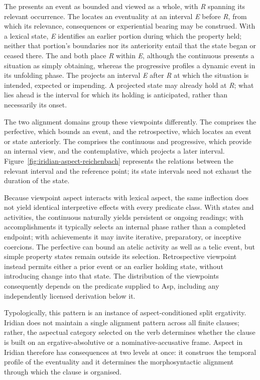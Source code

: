 The  presents an event as bounded and viewed as a whole,
with \textit{R} spanning its relevant occurrence. The 
locates an eventuality at an interval \textit{E} before \textit{R}, from which
its relevance, consequences or experiential bearing may be construed. With
a lexical state, \textit{E} identifies an earlier portion during which the
property held; neither that portion's boundaries nor its anteriority entail
that the state began or ceased there. The  and
 both place \textit{R} within \textit{E}, although the
continuous presents a situation as simply obtaining, whereas the progressive
profiles a dynamic event in its unfolding phase. The 
projects an interval \textit{E} after \textit{R} at which the situation is
intended, expected or impending. A projected state may already hold at
\textit{R}; what lies ahead is the interval for which its holding is
anticipated, rather than necessarily its onset.

The two alignment domains group these viewpoints differently. The
 comprises the perfective, which bounds an event,
and the retrospective, which locates an event or state anteriorly. The
 comprises the continuous and progressive,
which provide an internal view, and the contemplative, which projects a
later interval. Figure~\ref{fig:iridian-aspect-reichenbach} represents the
relations between the relevant interval and the reference point; its state
intervals need not exhaust the duration of the state.

Because viewpoint aspect interacts with lexical aspect, the same inflection does
not yield identical interpretive effects with every predicate class. With states
and activities, the continuous naturally yields persistent or ongoing readings;
with accomplishments it typically selects an internal phase rather than a
completed endpoint; with achievements it may invite iterative, preparatory, or
inceptive coercions. The perfective can bound an atelic activity as well as
a telic event, but simple property states remain outside its selection.
Retrospective viewpoint instead permits either a prior event or an earlier
holding state, without introducing change into that state. The distribution
of the viewpoints consequently depends on the predicate supplied to Asp,
including any independently licensed derivation below it.

Typologically, this pattern is an instance of aspect-conditioned split
ergativity. Iridian does not maintain a single alignment pattern across all
finite clauses; rather, the aspectual category selected on the verb determines
whether the clause is built on an ergative-absolutive or a nominative-accusative
frame. Aspect in Iridian therefore has consequences at two levels at once: it
construes the temporal profile of the eventuality and it determines the
morphosyntactic alignment through which the clause is organised.

